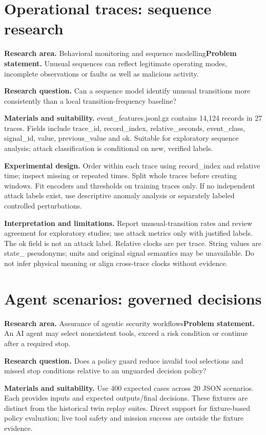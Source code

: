 \clearpage\section{Operational traces: sequence research}
\textbf{Research area.} Behavioral monitoring and sequence modelling\newline \textbf{Problem statement.} Unusual sequences can reflect legitimate operating modes, incomplete observations or faults as well as malicious activity.

\textbf{Research question.} Can a sequence model identify unusual transitions more consistently than a local transition-frequency baseline?

\textbf{Materials and suitability.} event\_features.jsonl.gz contains 14,124 records in 27 traces. Fields include trace\_id, record\_index, relative\_seconds, event\_class, signal\_id, value, previous\_value and ok. Suitable for exploratory sequence analysis; attack classification is conditional on new, verified labels.

\textbf{Experimental design.} Order within each trace using record\_index and relative time; inspect missing or repeated times. Split whole traces before creating windows. Fit encoders and thresholds on training traces only. If no independent attack labels exist, use descriptive anomaly analysis or separately labeled controlled perturbations.

\textbf{Interpretation and limitations.} Report unusual-transition rates and review agreement for exploratory studies; use attack metrics only with justified labels. The ok field is not an attack label. Relative clocks are per trace. String values are state\_ pseudonyms; units and original signal semantics may be unavailable. Do not infer physical meaning or align cross-trace clocks without evidence.

\clearpage\section{Agent scenarios: governed decisions}
\textbf{Research area.} Assurance of agentic security workflows\newline \textbf{Problem statement.} An AI agent may select nonexistent tools, exceed a risk condition or continue after a required stop.

\textbf{Research question.} Does a policy guard reduce invalid tool selections and missed stop conditions relative to an unguarded decision policy?

\textbf{Materials and suitability.} Use 400 expected cases across 20 JSON scenarios. Each provides inputs and expected outputs/final decisions. These fixtures are distinct from the historical twin replay suites. Direct support for fixture-based policy evaluation; live tool safety and mission success are outside the fixture evidence.

